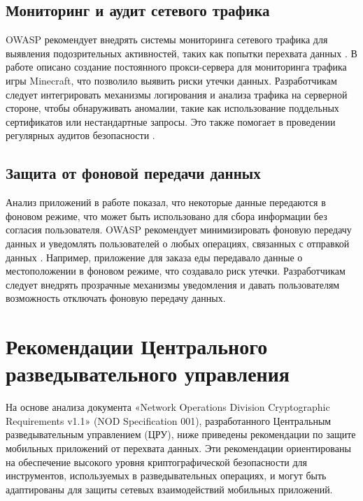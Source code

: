 \subsection{Мониторинг и аудит сетевого трафика}
OWASP рекомендует внедрять системы мониторинга сетевого трафика для выявления подозрительных активностей, таких как попытки перехвата данных \cite{owasp_mobile_security_testing_guide}. В работе описано создание постоянного прокси-сервера для мониторинга трафика игры Minecraft, что позволило выявить риски утечки данных. Разработчикам следует интегрировать механизмы логирования и анализа трафика на серверной стороне, чтобы обнаруживать аномалии, такие как использование поддельных сертификатов или нестандартные запросы. Это также помогает в проведении регулярных аудитов безопасности \cite{mitre_attck_mobile}.

\subsection{Защита от фоновой передачи данных}
Анализ приложений в работе показал, что некоторые данные передаются в фоновом режиме, что может быть использовано для сбора информации без согласия пользователя. OWASP рекомендует минимизировать фоновую передачу данных и уведомлять пользователей о любых операциях, связанных с отправкой данных \cite{owasp_mobile_security_project}. Например, приложение для заказа еды передавало данные о местоположении в фоновом режиме, что создавало риск утечки. Разработчикам следует внедрять прозрачные механизмы уведомления и давать пользователям возможность отключать фоновую передачу данных.

\section{Рекомендации Центрального разведывательного управления}

На основе анализа документа «Network Operations Division Cryptographic Requirements v1.1» (NOD Specification 001), разработанного Центральным разведывательным управлением (ЦРУ), ниже приведены рекомендации по защите мобильных приложений от перехвата данных. Эти рекомендации ориентированы на обеспечение высокого уровня криптографической безопасности для инструментов, используемых в разведывательных операциях, и могут быть адаптированы для защиты сетевых взаимодействий мобильных приложений.

